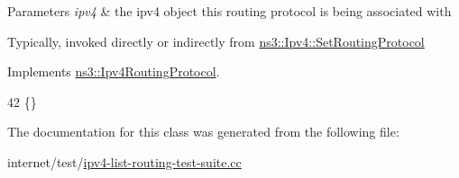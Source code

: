 \begin{DoxyParams}{Parameters}
{\em ipv4} & the ipv4 object this routing protocol is being associated with\\
\hline
\end{DoxyParams}
Typically, invoked directly or indirectly from \hyperlink{classns3_1_1Ipv4_a2d165c3bafd4ca580f02a03536db80d3}{ns3\+::\+Ipv4\+::\+Set\+Routing\+Protocol} 

Implements \hyperlink{classns3_1_1Ipv4RoutingProtocol_af3947a05b912ea3f2a1ef0e9777f723e}{ns3\+::\+Ipv4\+Routing\+Protocol}.


\begin{DoxyCode}
42 \{\}
\end{DoxyCode}


The documentation for this class was generated from the following file\+:\begin{DoxyCompactItemize}
\item 
internet/test/\hyperlink{ipv4-list-routing-test-suite_8cc}{ipv4-\/list-\/routing-\/test-\/suite.\+cc}\end{DoxyCompactItemize}
